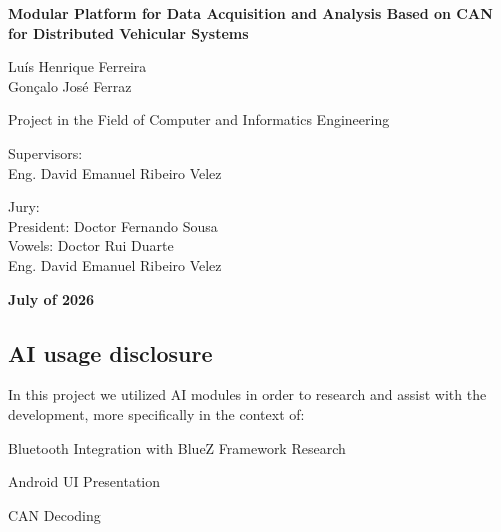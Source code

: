 \documentclass [11pt,twoside]{report}  %
\begin{document}
\vspace{40mm}
\begin{center}

\LARGE\textbf{Modular Platform for Data Acquisition and Analysis Based on CAN for Distributed Vehicular Systems}\\

\vspace*{\fill}

\Large Luís Henrique Ferreira\\
\Large Gonçalo José Ferraz\\

\vspace{10mm} 

\fontsize{10pt}{10pt}\selectfont
Project in the Field of Computer and Informatics Engineering


\vspace{10mm} 

\large{Supervisors:}\\
\normalsize
Eng. David Emanuel Ribeiro Velez\\

\vspace{10mm} 

\large{Jury:}\\
\normalsize
President: Doctor Fernando Sousa\\
Vowels:
Doctor Rui Duarte\\
Eng. David Emanuel Ribeiro Velez\\


\vspace{10mm} 

\small\textbf{July of 2026}
\normalsize


\end{center}
\clearpage
\thispagestyle{empty}
\textbf{}
\clearpage

\vspace*{\fill}
\begin{center}
\subsection*{AI usage disclosure}
\end{center}

In this project we utilized AI modules in order to research and assist with the development, more specifically in the context of:
\vspace{10mm}
\begin{center}
    Bluetooth Integration with BlueZ Framework Research
    \par
    Android UI Presentation
    \par
    CAN Decoding
    \par
\end{center}
\vspace*{\fill}
\end{document}
